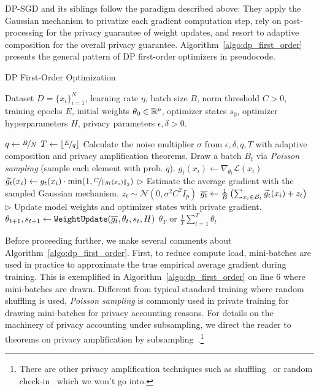 DP-SGD and its siblings follow the paradigm described above: They apply the Gaussian mechanism to privatize each gradient computation step, rely on post-processing for the privacy guarantee of weight updates, and resort to adaptive composition for the overall privacy guarantee. 
Algorithm~\ref{algo:dp_first_order} presents the general pattern of DP first-order optimizers in pseudocode.
\begin{algorithm}[H]
\centering
\caption{DP First-Order Optimization}
\begin{algorithmic}[1]
  Dataset $D=\{x_i\}_{i=1}^N$, learning rate $\eta$, batch size $B$, norm threshold $C > 0$, training epochs $E$, initial weights $\theta_0\in\mathbb{R}^p$, optimizer states $s_0$, optimizer hyperparameters $H$, privacy parameters $\epsilon, \delta > 0$.

  \State $q \gets \nicefrac{B}{N}$ 
  \State $T \gets \lfloor  \nicefrac{E}{q}  \rfloor$ 
  \State Calculate the noise multiplier $\sigma$ from $\epsilon, \delta, q, T$ with adaptive composition and privacy amplification theorems.
    \State Draw a batch $B_t$ via \emph{Poisson sampling} (sample each element with prob. $q$).
        \State $g_t(x_i) \gets \nabla_{\theta_t} \mathcal{L}(x_i)$ 
        \State $\widetilde{g_t}(x_i) \gets g_t(x_i) \cdot \min(1, \nicefrac{C}{ \left\lVert g_t(x_i)\right\rVert_2 })$ 
    \EndFor
    \State \(\triangleright\) {\color{red} Estimate the average gradient with the sampled Gaussian mechanism.} 
    \State $z_t \sim \mathcal{N}(0, \sigma^2 C^2 I_p)$
    \State $\mathop{\overline{g_t}} \gets \frac{1}{B} \left( 
        \sum_{x_i \in B_t} \widetilde{g_t}(x_i) + z_t
    \right)$
    \State \(\triangleright\) {\color{red} Update model weights and optimizer states with private gradient.}
    \State $\theta_{t + 1}, s_{t+1} \gets \texttt{WeightUpdate}(\mathop{\overline{g_t}}, \theta_t, s_t, H)$
    \EndFor
\State \Return $\theta_{T}$ or $\frac{1}{T}\sum_{t=1}^T \theta_t$
\end{algorithmic}
\label{algo:dp_first_order}
\end{algorithm}

Before proceeding further, we make several comments about Algorithm~\ref{algo:dp_first_order}.
First, to reduce compute load, mini-batches are used in practice to approximate the true empirical average gradient during training.
This is exemplified in Algorithm~\ref{algo:dp_first_order} on line 6 where mini-batches are drawn.
Different from typical standard training where random shuffling is used, \emph{Poisson sampling} is commonly used in private training for drawing mini-batches for privacy accounting reasons.
For details on the machinery of privacy accounting under subsampling, we direct the reader to theorems on privacy amplification by subsampling~\citep{balle2018privacy,zhu2019poission,mironov2019r}.\footnote{There are other privacy amplification techniques such as shuffling~\citep{erlingsson2019amplification} or random check-in~\citep{balle2020privacy} which we won't go into.}

